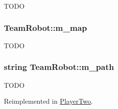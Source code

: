 \label{classTeamRobot_ad0b6cee88278087238bf6fcecb419808}
TODO \hypertarget{classTeamRobot_acf38fcc5b3c4ab4815fb151e39d5889c}{
\subsubsection[{m\_\-map}]{ {\bf TeamRobot::m\_\-map}}}
\label{classTeamRobot_acf38fcc5b3c4ab4815fb151e39d5889c}
TODO \hypertarget{classTeamRobot_af170b8d2e1b76b12f8cc83f6ec908e40}{
\subsubsection[{m\_\-path}]{\setlength{\rightskip}{0pt plus 5cm}string {\bf TeamRobot::m\_\-path}}}
\label{classTeamRobot_af170b8d2e1b76b12f8cc83f6ec908e40}
TODO 

Reimplemented in \hyperlink{classPlayerTwo_af9880885ced53351b52dcc949f6df162}{PlayerTwo}.

